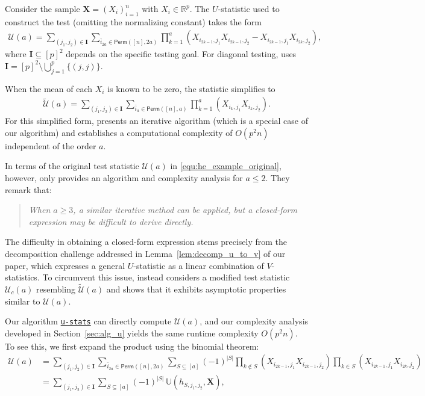 \documentclass[sn-mathphys, natbib=false]{sn-jnl}
\newcommand{\libref}[2]{\href{#2}{\texttt{#1}}}
\def\package{\libref{u-stats}{https://github.com/zrq1706/U-Statistics-Python}}
\theoremstyle{plain}
\theoremstyle{definition}
\def\tilde{\widetilde}
\newcommand{\ustat}{\mathbb{U}}
\newcommand{\perm}[1]{\mathsf{Perm}(#1)}
\def\package{\libref{u-stats}{https://github.com/zrq1706/U-Statistics-Python}}
\begin{document}
\begin{bibunit}[agsm]
Consider the sample $\bm{X} = (X_i)_{i=1}^n$ with $X_i \in \mathbb{R}^p$. The $U$-statistic used to construct the test (omitting the normalizing constant) takes the form
\begin{align}
    \mathcal{U}(a) = \sum_{(j_1,j_2) \in \mathbf{I}} \sum_{\bar{i}_{2a} \in \perm{[n],2a}} \prod_{k=1}^{a} (X_{i_{2k-1},j_1} X_{i_{2k-1},j_2} - X_{i_{2k-1},j_1} X_{i_{2k},j_2}),
    \label{equ:he_example_original}
\end{align}
where $\mathbf{I} \subseteq [p]^2$ depends on the specific testing goal. For diagonal testing, \cite{he2021asymptotically} uses $\mathbf{I} = [p]^2 \setminus \bigcup_{j=1}^p \{(j,j)\}$.

When the mean of each $X_i$ is known to be zero, the statistic simplifies to
\begin{align*}
    \tilde{\mathcal{U}}(a) = \sum_{(j_1,j_2) \in \mathbf{I}} \sum_{\bar{i}_{a} \in \perm{[n],a}} \prod_{k=1}^{a} (X_{i_{k},j_1} X_{i_{k},j_2}).
\end{align*}
For this simplified form, \cite{he2021asymptotically} presents an iterative algorithm (which is a special case of our algorithm) and establishes a computational complexity of $O(p^2 n)$ independent of the order $a$.

In terms of the original test statistic $\mathcal{U} (a)$ in \eqref{equ:he_example_original}, however, \citet{he2021asymptotically} only provides an algorithm and complexity analysis for $a \leq 2$. They remark that:
\begin{quote}
\emph{When $a \geq 3$, a similar iterative method can be applied, but a closed-form expression may be difficult to derive directly.}
\end{quote}

The difficulty in obtaining a closed-form expression stems precisely from the decomposition challenge addressed in Lemma~\ref{lem:decomp_u_to_v} of our paper, which expresses a general $U$-statistic as a linear combination of $V$-statistics. To circumvent this issue, \cite{he2021asymptotically} instead considers a modified test statistic $\mathcal{U}_c(a)$ resembling $\tilde{\mathcal{U}}(a)$ and shows that it exhibits asymptotic properties similar to $\mathcal{U}(a)$.

Our algorithm \package{} can directly compute $\mathcal{U}(a)$, and our complexity analysis developed in Section~\ref{sec:alg_u} yields the same runtime complexity $O(p^2 n)$. To see this, we first expand the product using the binomial theorem:
\begin{align*}
    \mathcal{U}(a) 
    &= \sum_{(j_1,j_2) \in \mathbf{I}} \sum_{\bar{i}_{2a} \in \perm{[n],2a}} \sum_{S \subseteq [a]} (-1)^{|S|} 
       \prod_{k \notin S} (X_{i_{2k-1},j_1} X_{i_{2k-1},j_2}) 
       \prod_{k \in S} (X_{i_{2k-1},j_1} X_{i_{2k},j_2}) \\
    &= \sum_{(j_1,j_2) \in \mathbf{I}} \sum_{S \subseteq [a]} (-1)^{|S|} \, \ustat(h_{S,j_1,j_2}, \bm{X}),
\end{align*}


\end{bibunit}
\end{document}

